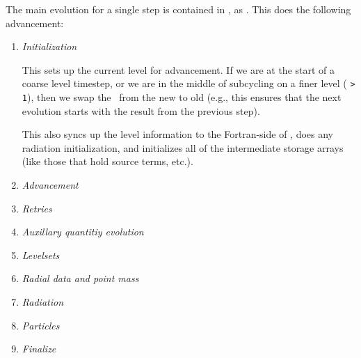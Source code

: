 The main evolution for a single step is contained in
, as .  This does
the following advancement:
\begin{enumerate}
\item {\em Initialization} 

  This sets up the current level for advancement.  If we are at the
  start of a coarse level timestep, or we are in the middle of
  subcycling on a finer level ( {\tt > 1}), then
  we swap the \statedata\ from the new to old (e.g., this ensures that
  the next evolution starts with the result from the previous step).

  This also syncs up the level information to the Fortran-side of
  \castro, does any radiation initialization, and initializes all of
  the intermediate storage arrays (like those that hold source terms,
  etc.).

\item {\em Advancement} \\

\item {\em Retries} \\

\item {\em Auxillary quantitiy evolution} \\

\item {\em Levelsets} \\

\item {\em Radial data and point mass} \\

\item {\em Radiation} \\

\item {\em Particles} \\

\item {\em Finalize}

\end{enumerate}


